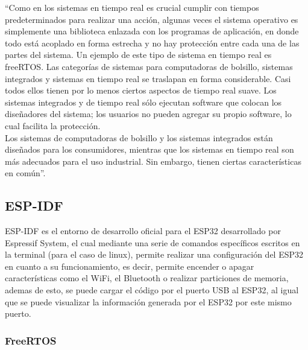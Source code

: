
``Como en los sistemas en tiempo real es crucial cumplir con tiempos predeterminados para realizar una acción, algunas veces el sistema operativo es simplemente una biblioteca enlazada con los programas de aplicación, en donde todo está acoplado en forma estrecha y no hay protección entre cada una de las partes del sistema. Un ejemplo de este tipo de sistema en tiempo real es freeRTOS.  Las categorías de sistemas para computadoras de bolsillo, sistemas integrados y sistemas en tiempo real se traslapan en forma considerable. Casi todos ellos tienen por lo menos ciertos aspectos de tiempo real suave. Los sistemas integrados y de tiempo real sólo ejecutan software que colocan los diseñadores del sistema; los usuarios no pueden agregar su propio software, lo cual facilita la protección. \\

Los sistemas de computadoras de bolsillo y los sistemas integrados están diseñados para los consumidores, mientras que los sistemas en tiempo real son más adecuados para el uso industrial. Sin embargo, tienen ciertas características en común''.\\

\subsection{ESP-IDF}

ESP-IDF es el entorno de desarrollo oficial para el ESP32 desarrollado por Espressif System, el cual mediante una serie de comandos específicos escritos en la terminal (para el caso de linux), permite realizar una configuración del ESP32 en cuanto a su funcionamiento, es decir, permite encender o apagar características como el WiFi, el Bluetooth o realizar particiones de memoria, ademas de esto, se puede cargar el código por el puerto USB al ESP32, al igual que se puede visualizar la información generada por el ESP32 por este mismo puerto.\\

\subsubsection{FreeRTOS}

